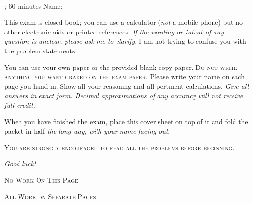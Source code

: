 \documentclass[answers,12pt]{exam}
\begin{document}
\noindent
\textbf{{\large \courseID \\ \assignmentID}}

\noindent
\dateID; 60 minutes  \hfill Name: \underline{\hspace{3in}} 

\addpoints

\noindent
This exam is closed book; you can use a calculator (\emph{not} a mobile phone) but no other electronic aids or printed references. \emph{If the wording or intent of any question is unclear, please ask me to clarify.} I am not trying to confuse you with the problem statements.

You can use your own paper or the provided blank copy paper. \textsc{Do not write anything you want graded on the exam paper.} Please write your name on each page you hand in. Show all your reasoning and all pertinent calculations. \emph{Give all answers in exact form. Decimal approximations of any accuracy will not receive full credit.}

When you have finished the exam, place this cover sheet on top of it and fold the packet in half \emph{the long way, with your name facing out}.


\begin{center}
\textsc{You are strongly encouraged to read all the problems before beginning.}
\end{center}


\begin{figure}[h]
\centering
\end{figure}

\begin{center}
    \gradetable
\end{center}


\begin{center}
    {\Large \emph{Good luck!}}
\end{center}

\newpage

\begin{center}
    {\Large \textsc{No Work On This Page}}

    {\Large \textsc{All Work on Separate Pages}}
\end{center}
\end{document}
